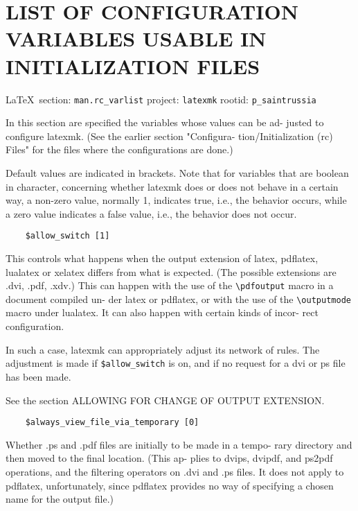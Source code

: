  
 

\section{LIST OF CONFIGURATION VARIABLES USABLE IN INITIALIZATION FILES}
  
\vspace{0.5cm}
 {\ifDEBUG\small\LaTeX~section: \verb|man.rc_varlist| project: \verb|latexmk| rootid: \verb|p_saintrussia| \fi}
\vspace{0.5cm}
  

In  this  section  are  specified the variables whose values can be ad-
justed to configure latexmk.   (See  the  earlier  section  "Configura-
tion/Initialization  (rc) Files" for the files where the configurations
are done.)

Default values are indicated in brackets.  Note that for variables that
are  boolean  in character, concerning whether latexmk does or does not
behave in a certain way, a non-zero value, normally 1, indicates  true,
i.e.,  the behavior occurs, while a zero value indicates a false value,
i.e., the behavior does not occur.

\begin{verbatim}
	$allow_switch [1]
\end{verbatim}

This controls what happens when the output extension  of  latex,
pdflatex,  lualatex  or  xelatex  differs from what is expected.
(The possible extensions are .dvi, .pdf, .xdv.)  This can happen
with  the use of the \verb|\pdfoutput| macro in a document compiled un-
der latex or pdflatex, or with the use of the \verb|\outputmode|  macro
under lualatex.  It can also happen with certain kinds of incor-
rect configuration.

In such a case, latexmk can appropriately adjust its network  of rules.  The
adjustment is made if \verb|$allow_switch| is on, and if no request for a dvi
or ps file has been made.

See the section ALLOWING FOR CHANGE OF OUTPUT EXTENSION.

\begin{verbatim}
	$always_view_file_via_temporary [0]
\end{verbatim}

Whether .ps and .pdf files are initially to be made in a  tempo-
rary  directory and then moved to the final location.  (This ap-
plies to dvips, dvipdf, and ps2pdf operations, and the filtering
operators on .dvi and .ps files.  It does not apply to pdflatex,
unfortunately, since pdflatex provides no way  of  specifying  a
chosen name for the output file.)

